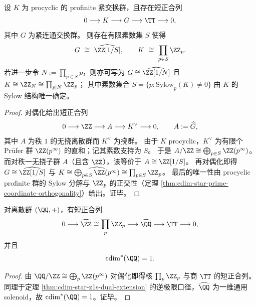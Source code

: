\begin{corollary}\label{cor:cdim-procyclic-fiber-solenoid-classification}
设 \(K\) 为 procyclic 的 profinite 紧交换群，且存在短正合列
\[
0\longrightarrow K\longrightarrow G\longrightarrow \TT\longrightarrow 0,
\]
其中 \(G\) 为紧连通交换群。
则存在有限素数集 \(S\) 使得
\[
G\ \cong\ \widehat{\ZZ[1/S]},
\qquad
K\ \cong\ \prod_{p\in S}\ZZ_p.
\]
若进一步令 \(N:=\prod_{p\in S}p\)，则亦可写为
\(
G\cong \widehat{\ZZ[1/N]}
\)
且
\(
K\cong \ZZ_N\cong \prod_{p\mid N}\ZZ_p
\)；
其中素数集合 \(S=\{p:\mathrm{Sylow}_p(K)\neq 0\}\) 由 \(K\) 的 Sylow 结构唯一确定。
\end{corollary}
\begin{proof}
对偶化给出短正合列
\[
0\longrightarrow \ZZ\longrightarrow A\longrightarrow K^\vee\longrightarrow 0,
\qquad A:=\widehat G,
\]
其中 \(A\) 为秩 \(1\) 的无挠离散群而 \(K^\vee\) 为挠群。
由于 \(K\) procyclic，\(K^\vee\) 为有限个 Prüfer 群 \(\ZZ(p^\infty)\) 的直和；记其素数支持为 \(S\)。
于是 \(A/\ZZ\cong \bigoplus_{p\in S}\ZZ(p^\infty)\)。
而对秩一无挠子群 \(A\)（且含 \(\ZZ\)），该等价于 \(A\cong \ZZ[1/S]\)。
再对偶化即得 \(G\cong \widehat{\ZZ[1/S]}\) 与
\(
K\cong \widehat{\bigoplus_{p\in S}\ZZ(p^\infty)}\cong \prod_{p\in S}\ZZ_p
\)。
最后的唯一性由 procyclic profinite 群的 Sylow 分解与 \(\ZZ_p\) 的正交性（定理 \ref{thm:cdim-star-prime-coordinate-orthogonality}）给出。证毕。
\end{proof}

\begin{corollary}[有理群的相位圆与全素数纤维分解]\label{cor:cdim-star-q-dual-extension}
对离散群 \((\QQ,+)\)，有短正合列
\[
0\longrightarrow \widehat{\ZZ}\cong\prod_{p}\ZZ_p
\longrightarrow \widehat{\QQ}
\longrightarrow \TT
\longrightarrow 0,
\]
并且
\[
\cdim^\ast(\QQ)=1.
\]
\end{corollary}
\begin{proof}
由
\(
\QQ/\ZZ\cong\bigoplus_p \ZZ(p^\infty)
\)
对偶化即得核 \(\prod_p\ZZ_p\) 与商 \(\TT\) 的短正合列。
同理于定理 \ref{thm:cdim-star-z1s-dual-extension} 的逆极限口径，\(\widehat\QQ\) 为一维通用 solenoid，故 \(\cdim^\ast(\QQ)=1\)。证毕。
\end{proof}


